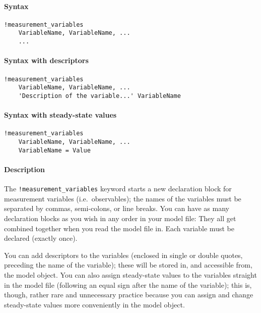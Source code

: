 


	\paragraph{Syntax}\label{syntax}

\begin{verbatim}
!measurement_variables
    VariableName, VariableName, ...
    ...
\end{verbatim}

\paragraph{Syntax with descriptors}\label{syntax-with-descriptors}

\begin{verbatim}
!measurement_variables
    VariableName, VariableName, ...
    'Description of the variable...' VariableName
\end{verbatim}

\paragraph{Syntax with steady-state
values}\label{syntax-with-steady-state-values}

\begin{verbatim}
!measurement_variables
    VariableName, VariableName, ...
    VariableName = Value
\end{verbatim}

\paragraph{Description}\label{description}

The \texttt{!measurement\_variables} keyword starts a new declaration
block for measurement variables (i.e.~observables); the names of the
variables must be separated by commas, semi-colons, or line breaks. You
can have as many declaration blocks as you wish in any order in your
model file: They all get combined together when you read the model file
in. Each variable must be declared (exactly once).

You can add descriptors to the variables (enclosed in single or double
quotes, preceding the name of the variable); these will be stored in,
and accessible from, the model object. You can also assign steady-state
values to the variables straight in the model file (following an equal
sign after the name of the variable); this is, though, rather rare and
unnecessary practice because you can assign and change steady-state
values more conveniently in the model object.

